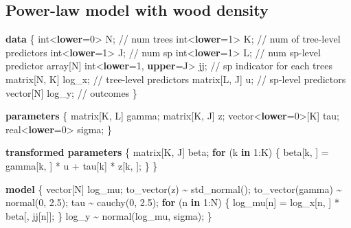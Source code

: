 \documentclass[
  12pt,
  letterpaper,
  DIV=11,
  numbers=noendperiod]{scrartcl}
\newenvironment{Shaded}{\begin{snugshade}}{\end{snugshade}}
\newcommand{\CommentTok}[1]{\textcolor[rgb]{0.37,0.37,0.37}{#1}}
\newcommand{\ControlFlowTok}[1]{\textcolor[rgb]{0.00,0.23,0.31}{\textbf{#1}}}
\newcommand{\DataTypeTok}[1]{\textcolor[rgb]{0.68,0.00,0.00}{#1}}
\newcommand{\DecValTok}[1]{\textcolor[rgb]{0.68,0.00,0.00}{#1}}
\newcommand{\FloatTok}[1]{\textcolor[rgb]{0.68,0.00,0.00}{#1}}
\newcommand{\KeywordTok}[1]{\textcolor[rgb]{0.00,0.23,0.31}{\textbf{#1}}}
\newcommand{\NormalTok}[1]{\textcolor[rgb]{0.00,0.23,0.31}{#1}}
\begin{document}
\newpage

\subsection{Power-law model with wood
density}\label{power-law-model-with-wood-density}

\begin{Shaded}
\begin{Highlighting}[]
\KeywordTok{data}\NormalTok{ \{}
  \DataTypeTok{int}\NormalTok{\textless{}}\KeywordTok{lower}\NormalTok{=}\DecValTok{0}\NormalTok{\textgreater{} N;                    }\CommentTok{// num trees}
  \DataTypeTok{int}\NormalTok{\textless{}}\KeywordTok{lower}\NormalTok{=}\DecValTok{1}\NormalTok{\textgreater{} K;                    }\CommentTok{// num of tree{-}level predictors}
  \DataTypeTok{int}\NormalTok{\textless{}}\KeywordTok{lower}\NormalTok{=}\DecValTok{1}\NormalTok{\textgreater{} J;                    }\CommentTok{// num sp}
  \DataTypeTok{int}\NormalTok{\textless{}}\KeywordTok{lower}\NormalTok{=}\DecValTok{1}\NormalTok{\textgreater{} L;                    }\CommentTok{// num sp{-}level predictor}
  \DataTypeTok{array}\NormalTok{[N] }\DataTypeTok{int}\NormalTok{\textless{}}\KeywordTok{lower}\NormalTok{=}\DecValTok{1}\NormalTok{, }\KeywordTok{upper}\NormalTok{=J\textgreater{} jj; }\CommentTok{// sp indicator for each trees}
  \DataTypeTok{matrix}\NormalTok{[N, K] log\_x;                }\CommentTok{// tree{-}level predictors}
  \DataTypeTok{matrix}\NormalTok{[L, J] u;                    }\CommentTok{// sp{-}level predictors}
  \DataTypeTok{vector}\NormalTok{[N] log\_y;                   }\CommentTok{// outcomes}
\NormalTok{\}}

\KeywordTok{parameters}\NormalTok{ \{}
  \DataTypeTok{matrix}\NormalTok{[K, L] gamma;}
  \DataTypeTok{matrix}\NormalTok{[K, J] z;}
  \DataTypeTok{vector}\NormalTok{\textless{}}\KeywordTok{lower}\NormalTok{=}\DecValTok{0}\NormalTok{\textgreater{}[K] tau;}
  \DataTypeTok{real}\NormalTok{\textless{}}\KeywordTok{lower}\NormalTok{=}\DecValTok{0}\NormalTok{\textgreater{} sigma;}
\NormalTok{\}}

\KeywordTok{transformed parameters}\NormalTok{ \{}
  \DataTypeTok{matrix}\NormalTok{[K, J] beta;}
  \ControlFlowTok{for}\NormalTok{ (k }\ControlFlowTok{in} \DecValTok{1}\NormalTok{:K) \{}
\NormalTok{    beta[k, ] = gamma[k, ] * u + tau[k] * z[k, ];}
\NormalTok{  \}}
\NormalTok{\}}

\KeywordTok{model}\NormalTok{ \{}
  \DataTypeTok{vector}\NormalTok{[N] log\_mu;}
\NormalTok{  to\_vector(z) \textasciitilde{} std\_normal();}
\NormalTok{  to\_vector(gamma) \textasciitilde{} normal(}\DecValTok{0}\NormalTok{, }\FloatTok{2.5}\NormalTok{);}
\NormalTok{  tau \textasciitilde{} cauchy(}\DecValTok{0}\NormalTok{, }\FloatTok{2.5}\NormalTok{);}
  \ControlFlowTok{for}\NormalTok{ (n }\ControlFlowTok{in} \DecValTok{1}\NormalTok{:N) \{}
\NormalTok{    log\_mu[n] = log\_x[n, ] * beta[, jj[n]];}
\NormalTok{  \}}
\NormalTok{  log\_y \textasciitilde{} normal(log\_mu, sigma);}
\NormalTok{\}}


\end{Highlighting}
\end{Shaded}
\end{document}

